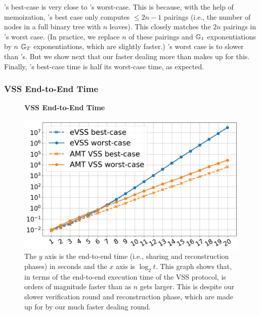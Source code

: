 \ourvss's best-case is very close to \evss's worst-case.
This is because, with the help of memoization, \ourvss's best case only computes $\le 2n-1$ pairings (i.e., the number of nodes in a full binary tree with $n$ leaves).
This closely matches the $2n$ pairings in \evss's worst case.
(In practice, we replace $n$ of these pairings and $\mathbb{G}_1$ exponentiations by $n$ $\mathbb{G}_T$ exponentiations, which are slightly faster.)
\ourvss's worst case is  to  slower than \evss's.
But we show next that our faster dealing more than makes up for this.
Finally, \evss's best-case time is half its worst-case time, as expected.

\subsubsection{VSS End-to-End Time}
\label{s:eval:vss:end-to-end}

\begin{figure}[t]
    \centering
    \textbf{VSS End-to-End Time}\par\medskip
    \includegraphics[width=0.70\columnwidth]{figures-thresh/vss-e2e-times.png}
    \caption{
        The $y$ axis is the end-to-end time (i.e., sharing and reconstruction phases) in seconds and the $x$ axis is $\log_2{t}$.
        This graph shows that, in terms of the end-to-end execution time of the VSS protocol, \ourvss is orders of magnitude faster than \evss as $n$ gets larger.
        This is despite our slower verification round and reconstruction phase, which are made up for by our much faster dealing round.
    }
    \label{f:vss-e2e-times}
\end{figure}

